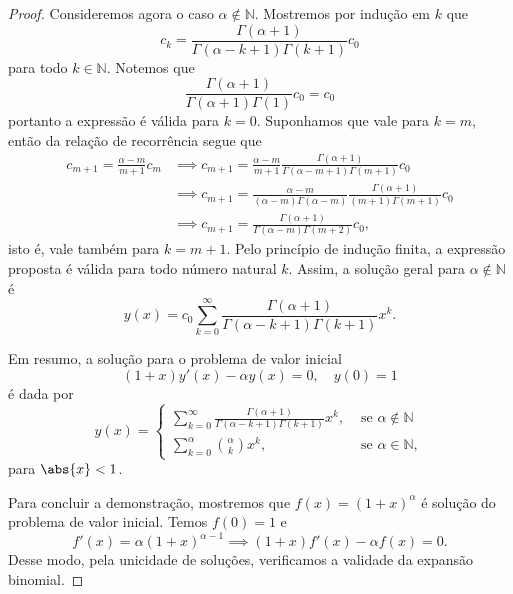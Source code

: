 \begin{proof}
    Consideremos agora o caso \(\alpha \notin \mathbb{N}\). Mostremos por indução em \(k\) que
    \begin{equation*}
        c_k = \frac{\Gamma(\alpha + 1)}{\Gamma(\alpha - k + 1) \Gamma(k + 1)}c_0
    \end{equation*}
    para todo \(k \in \mathbb{N}\). Notemos que
    \begin{equation*}
        \frac{\Gamma(\alpha + 1)}{\Gamma(\alpha + 1) \Gamma(1)}c_0 = c_0
    \end{equation*}
    portanto a expressão é válida para \(k = 0\). Suponhamos que vale para \(k = m\), então da relação de recorrência segue que
    \begin{align*}
        c_{m+1} = \frac{\alpha - m}{m+1} c_m &\implies c_{m+1} = \frac{\alpha - m}{m+1}\frac{\Gamma(\alpha + 1)}{\Gamma(\alpha - m + 1) \Gamma(m + 1)} c_0\\
                                             &\implies c_{m+1} = \frac{\alpha - m}{(\alpha - m) \Gamma(\alpha - m)} \frac{\Gamma(\alpha + 1)}{(m + 1) \Gamma(m+1)} c_0\\
                                             &\implies c_{m + 1} = \frac{\Gamma(\alpha + 1)}{\Gamma(\alpha - m)\Gamma(m+2)}c_0,
    \end{align*}
    isto é, vale também para \(k = m+1\). Pelo princípio de indução finita, a expressão proposta é válida para todo número natural \(k\). Assim, a solução geral para \(\alpha \notin \mathbb{N}\) é
    \begin{equation*}
        y(x) = c_0 \sum_{k=0}^\infty \frac{\Gamma(\alpha + 1)}{\Gamma(\alpha - k + 1)\Gamma(k + 1)}x^k.
    \end{equation*}

    Em resumo, a solução para o problema de valor inicial
    \begin{equation*}
        (1 + x)y'(x) - \alpha y(x) = 0,\quad y(0) = 1
    \end{equation*}
    é dada por
    \begin{equation*}
        y(x) = \begin{cases}
            \sum_{k=0}^\infty \frac{\Gamma(\alpha + 1)}{\Gamma(\alpha - k + 1)\Gamma(k + 1)}x^k, &\text{ se }\alpha \notin \mathbb{N}\\
            \sum_{k = 0}^{\alpha} \binom{\alpha}{k}x^k, & \text{ se }\alpha \in \mathbb{N},
        \end{cases}
    \end{equation*}
    para \(\abs{x} < 1\).

    Para concluir a demonstração, mostremos que \(f(x) = (1 + x)^\alpha\) é solução do problema de valor inicial. Temos \(f(0) = 1\) e
    \begin{equation*}
        f'(x) = \alpha(1 + x)^{\alpha - 1} \implies (1 + x)f'(x) - \alpha f(x) = 0.
    \end{equation*}
    Desse modo, pela unicidade de soluções, verificamos a validade da expansão binomial.
\end{proof}

